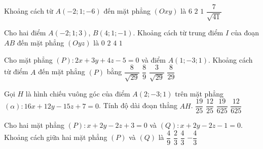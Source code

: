 \begin{ex}
	Khoảng cách từ $ A(-2;1;-6) $ đến mặt phẳng $ (Oxy) $ là 
	\choice
	{\True $ 6 $}
	{$ 2 $}
	{$ 1 $}
	{$ \dfrac{7}{\sqrt{41}} $}
\end{ex}
\begin{ex}
	Cho hai điểm $A(-2;1;3)$, $B(4;1;-1)$. Khoảng cách từ trung điểm $I$ của đoạn $AB$ đến mặt phẳng $(Oyz)$ là
	\choice
	{$0$}
	{$2$}
	{$4$}
	{\True $1$}
\end{ex}

\begin{ex}%
	Cho mặt phẳng $(P)\colon 2x+3y+4z-5=0$ và điểm $A(1;-3;1)$. Khoảng cách từ điểm $A$ đến mặt phẳng $(P)$ bằng
	\choice
	{\True $\dfrac{8}{\sqrt{29}}$}
	{$\dfrac{8}{9}$}
	{$\dfrac{3}{\sqrt{29}}$}
	{$\dfrac{8}{29}$}
\end{ex}
\begin{ex}
	Gọi $H$ là hình chiếu vuông góc của điểm $A(2;-3;1)$ trên mặt phẳng $(\alpha)\colon 16x+12y-15z+7=0$. Tính độ dài đoạn thẳng $AH$.
	\choice
	{$\dfrac{19}{25}$}
	{\True $\dfrac{12}{25}$}
	{$\dfrac{19}{625}$}
	{$\dfrac{12}{625}$}
\end{ex}
\begin{ex}%
	Cho hai mặt phẳng $(P)\colon x+2y-2z+3=0$ và $(Q)\colon x+2y-2z-1=0$. Khoảng cách giữa hai mặt phẳng $(P)$ và $(Q)$ là 
	\choice 
	{$\dfrac{4}{9}$}
	{$\dfrac{2}{3}$}
	{\True $\dfrac{4}{3}$}
	{$-\dfrac{4}{3}$}
	
\end{ex}

